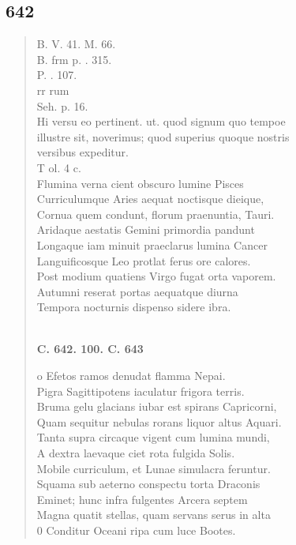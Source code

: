 \documentclass[11pt, a4paper]{report}
\begin{document}
            \subsection*{642}
      \begin{verse}
      B. V. 41. M. 66. \\ B. frm p. . 315. \\ P. . 107. \\ rr rum \\ Seh. p. 16. \\ Hi versu eo pertinent. ut. quod signum quo tempoe \\ illustre sit, noverimus; quod superius quoque nostris \\ versibus expeditur. \\ T ol. 4 c. \\ Flumina verna cient obscuro lumine Pisces \\ Curriculumque Aries aequat noctisque dieique, \\ Cornua quem condunt, florum praenuntia, Tauri. \\ Aridaque aestatis Gemini primordia pandunt \\ Longaque iam minuit praeclarus lumina Cancer \\ Languificosque Leo protlat ferus ore calores. \\ Post modium quatiens Virgo fugat orta vaporem. \\ Autumni reserat portas aequatque diurna \\ Tempora nocturnis dispenso sidere ibra. \\ 
        ﻿\pagebreak 
    \begin{center} \textbf{C. 642. 100. C. 643} \end{center} \marginpar{[109]} o Efetos ramos denudat flamma Nepai. \\ Pigra Sagittipotens iaculatur frigora terris. \\ Bruma gelu glacians iubar est spirans Capricorni, \\ Quam sequitur nebulas rorans liquor altus Aquari. \\ Tanta supra circaque vigent cum lumina mundi, \\ A dextra laevaque ciet rota fulgida Solis. \\ Mobile curriculum, et Lunae simulacra feruntur. \\ Squama sub aeterno conspectu torta Draconis \\ Eminet; hunc infra fulgentes Arcera septem \\ Magna quatit stellas, quam servans serus in alta \\ 0 Conditur Oceani ripa cum luce Bootes. \\ 
      \end{verse}
  
\end{document}
